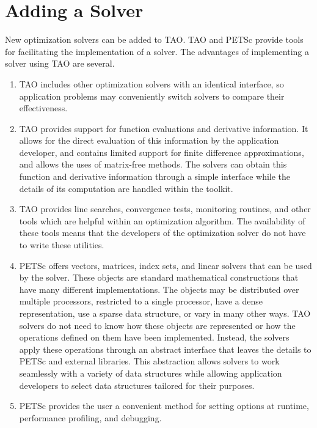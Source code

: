 
\chapter{Adding a Solver}
\label{chapter:addsolver}

New optimization solvers can be added to TAO.  TAO and PETSc provide tools for
facilitating the implementation of a solver.  The advantages of implementing
a solver using TAO are several.

\begin{enumerate}
\item TAO includes other optimization solvers with an identical interface, 
so application problems may
conveniently switch solvers to compare their effectiveness.

\item TAO provides support for function evaluations and
derivative information.  It allows for the direct evaluation
of this information by the application developer, 
and contains limited support for finite difference approximations, and
allows the uses of matrix-free methods.
The solvers can obtain this function and derivative information
through a simple interface  while the details of its computation 
are handled within the toolkit.

\item TAO provides line searches, convergence
tests, monitoring routines, and other tools
which are helpful within an optimization algorithm.
The availability
of these tools means that the developers of the optimization
solver do not have to write these utilities.

\item PETSc offers vectors, matrices, index sets, and linear solvers
that can be used by the solver.  These objects are standard mathematical
constructions that have many different implementations.
The objects may be distributed over multiple processors, restricted to
a single processor, have a dense representation, 
use a sparse data structure, or vary in many other ways.  
TAO solvers do not need to know how
these objects are represented or how the operations defined on them
have been implemented.  Instead, the solvers apply these operations
through an abstract interface that leaves the details to PETSc
and external libraries.
This abstraction allows solvers to work seamlessly with a variety
of data structures while allowing application developers to select 
data structures tailored for their purposes.

\item PETSc provides the user a convenient
method for setting options at runtime, performance profiling, and debugging.

\end{enumerate}


